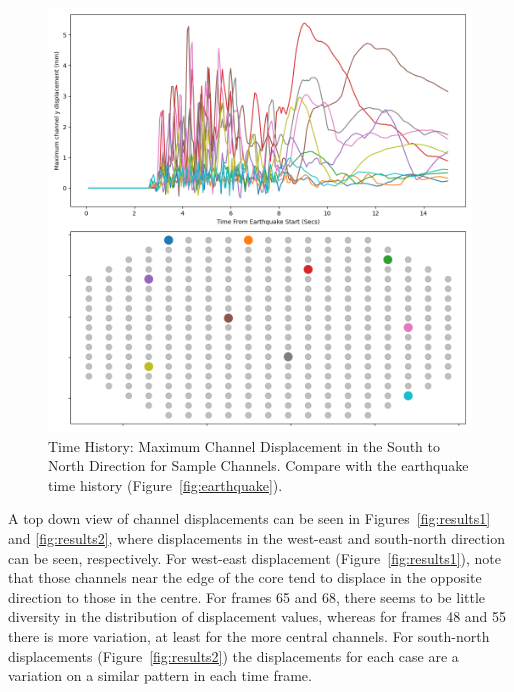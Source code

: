 \begin{figure}[p]
	\centering
	\includegraphics[scale=0.45]{Figures/time_history_y.png}
	\caption{Time History: Maximum Channel Displacement in the South to North Direction for Sample Channels. Compare with the earthquake time history (Figure~\ref{fig:earthquake}).}
	\label{fig:time_history_2}
\end{figure}

\noindent
A top down view of channel displacements can be seen in Figures~\ref{fig:results1}
and \ref{fig:results2}, where displacements in the west-east and south-north direction can be seen, respectively. For west-east displacement (Figure~\ref{fig:results1}), note that those channels near the edge of the core tend to displace in the opposite direction to those in the centre. For frames 65 and 68, there seems to be little diversity in the distribution of displacement values, whereas for frames 48 and 55 there is more variation, at least for the more central channels. For south-north displacements (Figure~\ref{fig:results2}) the displacements for each case are a variation on a similar pattern in each time frame.
\\

